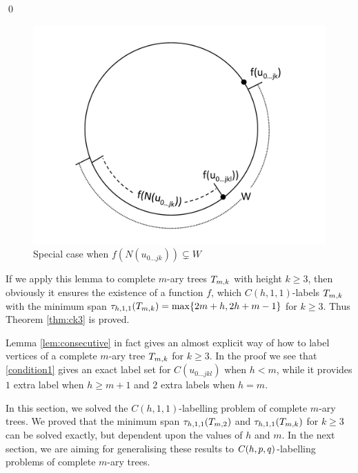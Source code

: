 \qed
\begin{figure}
 \centering
     \vspace{-10pt}
    \includegraphics[scale=0.4]{../figures/fig4-7.pdf}
    \vspace{-0pt}
\caption{Special case when $f(N(u_{0\dots jk})) \subsetneq W$} 
\label{lemma ex 2}
\end{figure}


If we apply this lemma to complete $m$-ary trees $T_{m,k}$ with height $k \ge 3$, then obviously it ensures the existence of a function $f$, which $C(h,1,1)$-labels $T_{m,k}$ with the minimum span $\tau_{h,1,1}(T_{m,k}) = \max\{2m+h, 2h+m-1\}$ for $k \ge 3$. Thus Theorem \ref{thm:ck3} is proved. 

\begin{remark}
\label{howtolabel}
Lemma \ref{lem:consecutive} in fact gives an almost explicit way of how to label vertices of a complete $m$-ary tree $T_{m,k}$ for $k \ge 3$. In the proof we see that \eqref{condition1} gives an exact label set for $C(u_{0\dots jkl})$ when $h<m$, while it provides $1$ extra label when $h \ge m+1$ and $2$ extra labels when $h=m$. 
\end{remark}

In this section, we solved the $C(h,1,1)$-labelling problem of complete $m$-ary trees. We proved that the minimum span $\t_{h,1,1}(\tm2)$ and $\tau_{h,1,1}(T_{m,k})$ for $k \ge 3$ can be solved exactly, but dependent upon the values of $h$ and $m$. In the next section, we are aiming for generalising these results to $C(h,p,q)$-labelling problems of complete $m$-ary trees. 

